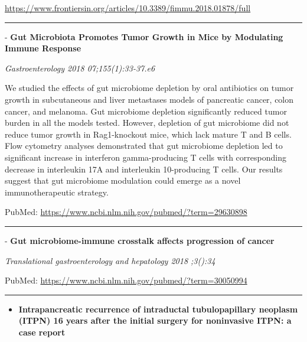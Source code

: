 \documentclass[]{article}
\providecommand{\tightlist}{%
  \setlength{\itemsep}{0pt}\setlength{\parskip}{0pt}}
\begin{document}
\url{https://www.frontiersin.org/articles/10.3389/fimmu.2018.01878/full}

\begin{center}\rule{0.5\linewidth}{\linethickness}\end{center}

 - \textbf{Gut Microbiota Promotes Tumor Growth in Mice by Modulating
Immune Response}

\emph{Gastroenterology 2018 07;155(1):33-37.e6}

We studied the effects of gut microbiome depletion by oral antibiotics
on tumor growth in subcutaneous and liver metastases models of
pancreatic cancer, colon cancer, and melanoma. Gut microbiome depletion
significantly reduced tumor burden in all the models tested. However,
depletion of gut microbiome did not reduce tumor growth in Rag1-knockout
mice, which lack mature T and B cells. Flow cytometry analyses
demonstrated that gut microbiome depletion led to significant increase
in interferon gamma-producing T cells with corresponding decrease in
interleukin 17A and interleukin 10-producing T cells. Our results
suggest that gut microbiome modulation could emerge as a novel
immunotherapeutic strategy.

PubMed: \url{https://www.ncbi.nlm.nih.gov/pubmed/?term=29630898}

{}

{}

\begin{center}\rule{0.5\linewidth}{\linethickness}\end{center}

 - \textbf{Gut microbiome-immune crosstalk affects progression of
cancer}

\emph{Translational gastroenterology and hepatology 2018 ;3():34}

PubMed: \url{https://www.ncbi.nlm.nih.gov/pubmed/?term=30050994}

{}

{}

\begin{center}\rule{0.5\linewidth}{\linethickness}\end{center}

\begin{itemize}
\tightlist
\item
  \textbf{Intrapancreatic recurrence of intraductal tubulopapillary
  neoplasm (ITPN) 16 years after the initial surgery for noninvasive
  ITPN: a case report}
\end{itemize}
\end{document}
